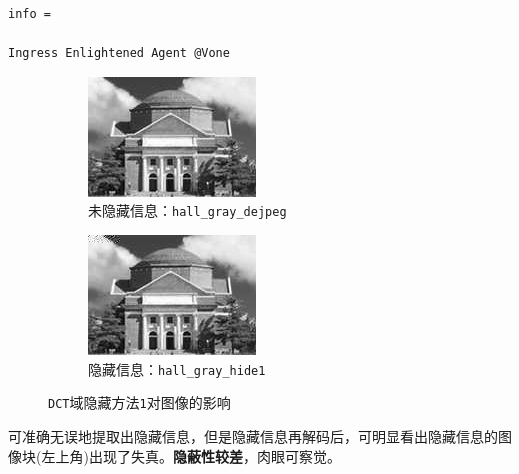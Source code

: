 \documentclass{article}
\numberwithin{figure}{section}
\numberwithin{table}{section}
\numberwithin{listing}{section}
\numberwithin{equation}{section}
\begin{document}
\begin{enumerate}
\begin{enumerate}
\begin{verbatim}
info =

Ingress Enlightened Agent @Vone 
                        \end{verbatim}

                        \begin{figure}[H]
                            \centering
                            \begin{subfigure}{0.5\textwidth}
                                \centering
                                \includegraphics[width=0.6\linewidth]{hall_gray_dejpeg}
                                \caption{未隐藏信息：\texttt{hall\_gray\_dejpeg}}
                            \end{subfigure}%
                            \begin{subfigure}{0.5\textwidth}
                                \centering
                                \includegraphics[width=0.6\linewidth]{hall_gray_hide1}
                                \caption{隐藏信息：\texttt{hall\_gray\_hide1}}
                            \end{subfigure}
                            \caption{\texttt{DCT}域隐藏方法\texttt{1}对图像的影响}
                        \end{figure}

                        可准确无误地提取出隐藏信息，但是隐藏信息再解码后，可明显看出隐藏信息的图像块(左上角)出现了失真。\textbf{隐蔽性较差}，肉眼可察觉。


\end{enumerate}
\end{enumerate}
\end{document}
